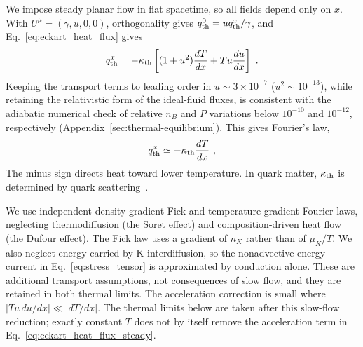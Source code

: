 \documentclass[10pt,superscriptaddress,
amsmath,aps,prc,twocolumn,nofootinbib,floatfix]{revtex4-1}
\newcommand{\JS}[1]{{\color{violet}#1}}
\begin{document}
We impose steady planar flow in flat spacetime, so all fields depend only on $x$.
With $U^\mu=(\gamma,u,0,0)$, orthogonality gives $q_{\rm th}^0=u q_{\rm th}^x/\gamma$, and Eq.~\eqref{eq:eckart_heat_flux} gives
\begin{equation}
q_{\rm th}^x=-\kappa_{\rm th}\left[(1+u^2)\frac{dT}{dx}
+T u\frac{du}{dx}\right]\ .
\label{eq:eckart_heat_flux_steady}
\end{equation}
Keeping the transport terms to leading order in $u\sim3\times10^{-7}$ ($u^2\sim10^{-13}$), while retaining the relativistic form of the ideal-fluid fluxes, is consistent with the adiabatic numerical check of relative $n_B$ and $P$ variations below $10^{-10}$ and $10^{-12}$, respectively (Appendix~\ref{sec:thermal-equilibrium}).
This gives Fourier's law,
\begin{equation}
    q_{\rm th}^x\simeq-\kappa_{\rm th}\frac{dT}{dx}\ ,
    \label{eq:fourier_heat_flux}
\end{equation}
The minus sign directs heat toward lower temperature.
In quark matter, $\kappa_{\rm th}$ is determined by quark scattering~\cite{Heiselberg:1993cr}.%

\JS{We use independent density-gradient Fick and temperature-gradient Fourier laws, neglecting thermodiffusion (the Soret effect) and composition-driven heat flow (the Dufour effect).
The Fick law uses a gradient of $n_K$ rather than of $\mu_K/T$.
We also neglect energy carried by K interdiffusion, so the nonadvective energy current in Eq.~\eqref{eq:stress_tensor} is approximated by conduction alone.
These are additional transport assumptions, not consequences of slow flow, and they are retained in both thermal limits.
The acceleration correction is small where $|T u\,du/dx|\ll|dT/dx|$.
The thermal limits below are taken after this slow-flow reduction; exactly constant $T$ does not by itself remove the acceleration term in Eq.~\eqref{eq:eckart_heat_flux_steady}.}
\end{document}
